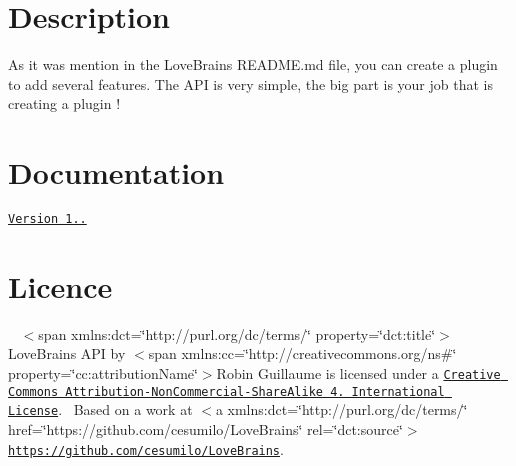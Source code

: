 \section*{Description}

As it was mention in the Love\+Brains R\+E\+A\+D\+M\+E.\+md file, you can create a plugin to add several features. The A\+P\+I is very simple, the big part is your job that is creating a plugin !

\section*{Documentation}

\href{}{\tt Version 1..}

\section*{Licence}

\href{http://creativecommons.org/licenses/by-nc-sa/4.0/}{\tt }~\newline
$<$span xmlns\+:dct=\char`\"{}http\+://purl.\+org/dc/terms/\char`\"{} property=\char`\"{}dct\+:title\char`\"{}$>$Love\+Brains A\+P\+I by $<$span xmlns\+:cc=\char`\"{}http\+://creativecommons.\+org/ns\#\char`\"{} property=\char`\"{}cc\+:attribution\+Name\char`\"{}$>$Robin Guillaume is licensed under a \href{http://creativecommons.org/licenses/by-nc-sa/4.0/}{\tt Creative Commons Attribution-\/\+Non\+Commercial-\/\+Share\+Alike 4. International License}.~\newline
Based on a work at $<$a xmlns\+:dct=\char`\"{}http\+://purl.\+org/dc/terms/\char`\"{} href=\char`\"{}https\+://github.\+com/cesumilo/\+Love\+Brains\char`\"{} rel=\char`\"{}dct\+:source\char`\"{}$>$\href{https://github.com/cesumilo/LoveBrains}{\tt https\+://github.\+com/cesumilo/\+Love\+Brains}. 